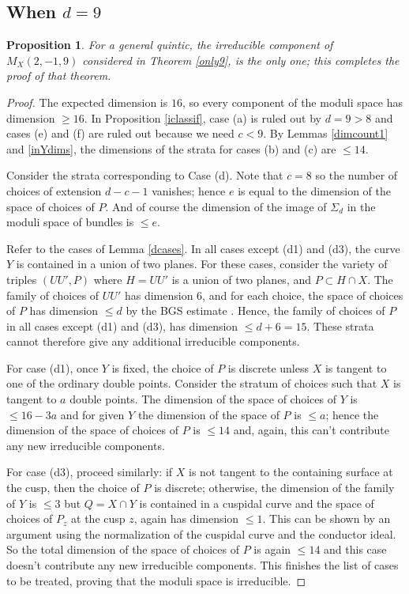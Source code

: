 \documentclass{amsart}
\theoremstyle{plain}
\newtheorem{proposition}[theorem]{Proposition}
\numberwithin{equation}{section}
\begin{document}
\subsection{When $d=9$}

\begin{proposition}
\label{d9cor}
For a general quintic, the irreducible component of $M_X(2,-1,9)$ considered
in Theorem \ref{only9}, is the only one; this completes the proof of that theorem.
\end{proposition}
\begin{proof}
The expected dimension is $16$, so every component of the moduli space has
dimension $\geq 16$. 
In Proposition  \ref{iclassif}, case (a) is ruled out by $d=9>8$ and cases (e) and (f)
are ruled out because we need $c<9$. By Lemmas \ref{dimcount1}  and \ref{inYdims},
the dimensions of the strata for cases (b) and (c) are $\leq 14$. 

Consider the strata corresponding to Case (d). Note that $c=8$ so
the number of choices of extension $d-c-1$ vanishes; hence $e$ is equal to the
dimension of the space of choices of $P$. And of course 
the dimension of the image of $\Sigma _d$ in the moduli space of bundles
is $\leq e$. 

Refer to the cases of Lemma \ref{dcases}.
In all cases except (d1) and (d3), the curve $Y$ is contained in a union of two planes.
For these cases, consider the variety of triples $(UU',P)$ where $H=UU'$ is a union of
two planes, and $P\subset H\cap X$. The family of choices of $UU'$ has dimension $6$,
and for each choice, the space of choices of $P$ has dimension $\leq d$ by the
BGS estimate \cite{BGS}. Hence, the family of choices of $P$ in all cases except (d1) and (d3),
has dimension $\leq d+6=15$. These strata cannot therefore give any additional irreducible
components. 

For case (d1), once $Y$ is fixed, the choice of $P$ is discrete unless $X$ is tangent
to one of the ordinary double points. Consider the stratum of choices such that $X$ is 
tangent to $a$ double points. The dimension of the space of choices of $Y$ is $\leq 16-3a$
and for given $Y$ the dimension of the space of $P$ is $\leq a$; hence the dimension of the
space of choices of $P$ is $\leq 14$ and, again, this can't contribute any new irreducible
components. 

For case (d3), proceed similarly: if $X$ is not tangent to the containing surface at
the cusp, then the choice of $P$ is discrete; otherwise, the dimension of the family of $Y$ is $\leq 3$ but $Q=X\cap Y$ is contained in
a cuspidal curve and the space of choices of $P_z$ at the cusp $z$, again has dimension 
$\leq 1$. This can be shown by an argument using the normalization of the cuspidal
curve and the conductor ideal. So the total dimension of the space of choices of $P$ is
again $\leq 14$ and this case doesn't contribute any new irreducible components.
This finishes the list of cases to be treated, proving that the moduli space is
irreducible.
\end{proof}
\end{document}
